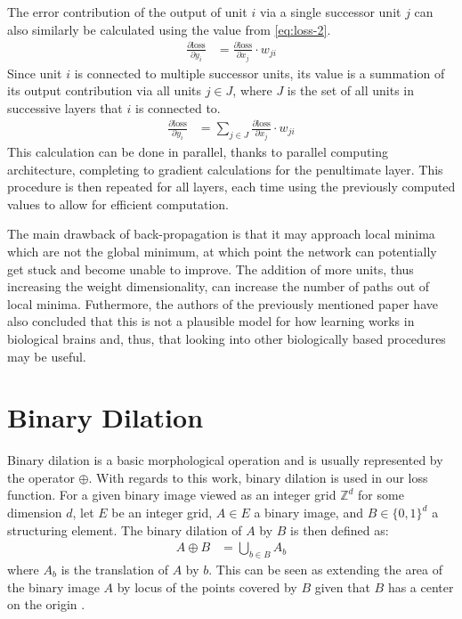 The error contribution of the output of unit $i$ via a single successor unit $j$ can also similarly be calculated using the value from \eqref{eq:loss-2}.
\begin{align}\label{eq:loss-4}
	\frac{\partial \text{loss}}{\partial y_i} &= \frac{\partial \text{loss}}{\partial x_j} \cdot w_{ji}
\end{align}
Since unit $i$ is connected to multiple successor units, its value is a summation of its output contribution via all units $j \in J$, where $J$ is the set of all units in successive layers that $i$ is connected to.
\begin{align}
	\frac{\partial \text{loss}}{\partial y_i} &= \sum_{j \in J} \frac{\partial \text{loss}}{\partial x_j} \cdot w_{ji}
\end{align}
This calculation can be done in parallel, thanks to parallel computing architecture, completing to gradient calculations for the penultimate layer.
This procedure is then repeated for all layers, each time using the previously computed values to allow for efficient computation.

The main drawback of back-propagation is that it may approach local minima which are not the global minimum, at which point the network can potentially get stuck and become unable to improve.
The addition of more units, thus increasing the weight dimensionality, can increase the number of paths out of local minima.
Futhermore, the authors of the previously mentioned paper have also concluded that this is not a plausible model for how learning works in biological brains and, thus, that looking into other biologically based procedures may be useful.



\section{Binary Dilation}\label{section:background-dilation}
Binary dilation is a basic morphological operation and is usually represented by the operator $\oplus$.
With regards to this work, binary dilation is used in our loss function.
For a given binary image viewed as an integer grid $\mathbb{Z}^d$ for some dimension $d$, let $E$ be an integer grid, $A \in E$ a binary image, and $B \in \{0,1\}^d$ a structuring element.
The binary dilation of $A$ by $B$ is then defined as:
\begin{align}
	A \oplus B &= \bigcup_{b \in B}A_b
\end{align}
where $A_b$ is the translation of $A$ by $b$.
This can be seen as extending the area of the binary image $A$ by locus of the points covered by $B$ given that $B$ has a center on the origin \cite{morphology}.
